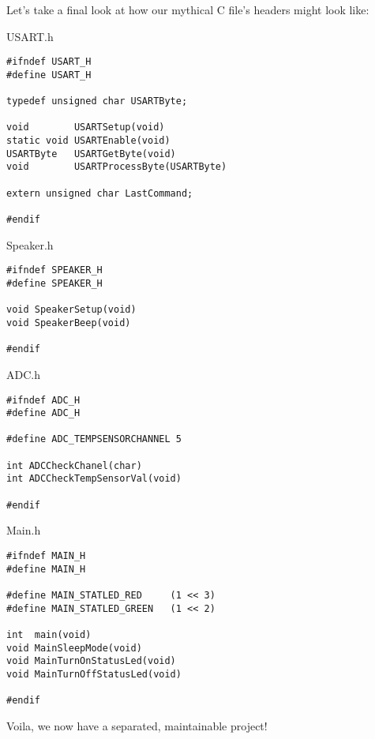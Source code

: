 \documentclass[a4paper,oneside]{book}
\begin{document}
Let's take a final look at how our mythical C file's headers might look like:

USART.h
\begin{center}
\begin{lstlisting}
#ifndef USART_H
#define USART_H

typedef unsigned char USARTByte;

void        USARTSetup(void)
static void USARTEnable(void)
USARTByte   USARTGetByte(void)
void        USARTProcessByte(USARTByte)

extern unsigned char LastCommand;

#endif
\end{lstlisting}
\end{center}

Speaker.h
\begin{center}
\begin{lstlisting}
#ifndef SPEAKER_H
#define SPEAKER_H

void SpeakerSetup(void)
void SpeakerBeep(void)

#endif
\end{lstlisting}
\end{center}

ADC.h
\begin{center}
\begin{lstlisting}
#ifndef ADC_H
#define ADC_H

#define ADC_TEMPSENSORCHANNEL 5

int ADCCheckChanel(char)
int ADCCheckTempSensorVal(void)

#endif
\end{lstlisting}
\end{center}

Main.h
\begin{center}
\begin{lstlisting}
#ifndef MAIN_H
#define MAIN_H

#define MAIN_STATLED_RED     (1 << 3)
#define MAIN_STATLED_GREEN   (1 << 2)

int  main(void)
void MainSleepMode(void)
void MainTurnOnStatusLed(void)
void MainTurnOffStatusLed(void)

#endif
\end{lstlisting}
\end{center}

Voila, we now have a separated, maintainable project! 
\end{document}

